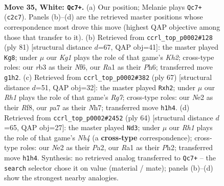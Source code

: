 \documentclass[11pt]{article}
\begin{document}
\clearpage

\begin{figure}[p]\centering
\begin{subfigure}{0.46\textwidth}\centering
\resizebox{\linewidth}{!}{%
\newchessgame
\chessboard[
  setfen={5n2/pp4kp/7p/1P6/3P4/1r3q2/2Q1N3/R5KR w - - 5 35},
  showmover=false,
  pgfstyle=straightmove, color=movearrow, markmove={c2-c7}
]}
\caption{}
\end{subfigure}\hfill
\begin{subfigure}{0.46\textwidth}\centering
\resizebox{\linewidth}{!}{%
\newchessgame
\chessboard[
  setfen={8/6pk/4qn1p/8/2PQ4/4r1PP/3N1RK1/8 b - - 4 41},
  showmover=false,
  pgfstyle=straightmove, color=movearrow, markmove={h7-g8}
]}
\caption{}
\end{subfigure}
\\[4pt]
\begin{subfigure}{0.46\textwidth}\centering
\resizebox{\linewidth}{!}{%
\newchessgame
\chessboard[
  setfen={5r1k/2q4n/p2N1p2/8/4Q3/8/PPP1N1rP/1K1R4 b - - 3 34},
  showmover=false,
  pgfstyle=straightmove, color=movearrow, markmove={g2-h2}
]}
\caption{}
\end{subfigure}\hfill
\begin{subfigure}{0.46\textwidth}\centering
\resizebox{\linewidth}{!}{%
\newchessgame
\chessboard[
  setfen={5r1k/3p2pp/p7/3Q4/1N6/8/Pqp4P/2R4K w - - 4 33},
  showmover=false,
  pgfstyle=straightmove, color=movearrow, markmove={b4-d3}
]}
\caption{}
\end{subfigure}
\caption{\textbf{Move 35, White: \texttt{Qc7+}.} (a) Our position; Melanie plays \texttt{Qc7+} (\texttt{c2c7}). Panels (b)--(d) are the retrieved master positions whose correspondence most drove this move (highest QAP objective among those that transfer to it). (b) Retrieved from \texttt{ccrl\_top\_p0002\#128} (ply 81) [structural distance $d$=67, QAP obj=41]: the master played \texttt{Kg8}; under $\mu$ our \emph{Kg1} plays the role of that game's \emph{Kh2}; cross-type roles: our \emph{r}b3 as their \emph{N}f6, our \emph{R}a1 as their \emph{P}h6; transferred move \texttt{g1h2}. (c) Retrieved from \texttt{ccrl\_top\_p0002\#382} (ply 67) [structural distance $d$=51, QAP obj=32]: the master played \texttt{Rxh2}; under $\mu$ our \emph{Rh1} plays the role of that game's \emph{Rg7}; cross-type roles: our \emph{N}e2 as their \emph{R}f8, our \emph{p}a7 as their \emph{N}h7; transferred move \texttt{h1h4}. (d) Retrieved from \texttt{ccrl\_top\_p0002\#2452} (ply 64) [structural distance $d$=65, QAP obj=27]: the master played \texttt{Nd3}; under $\mu$ our \emph{Rh1} plays the role of that game's \emph{Nb4} (a \textbf{cross-type} correspondence); cross-type roles: our \emph{N}e2 as their \emph{P}a2, our \emph{R}a1 as their \emph{P}h2; transferred move \texttt{h1h4}. Synthesis: no retrieved analog transferred to \texttt{Qc7+} -- the \texttt{search} selector chose it on value (material / mate); panels (b)--(d) show the strongest nearby analogies.}
\label{fig:thought-m68}
\end{figure}
\end{document}
